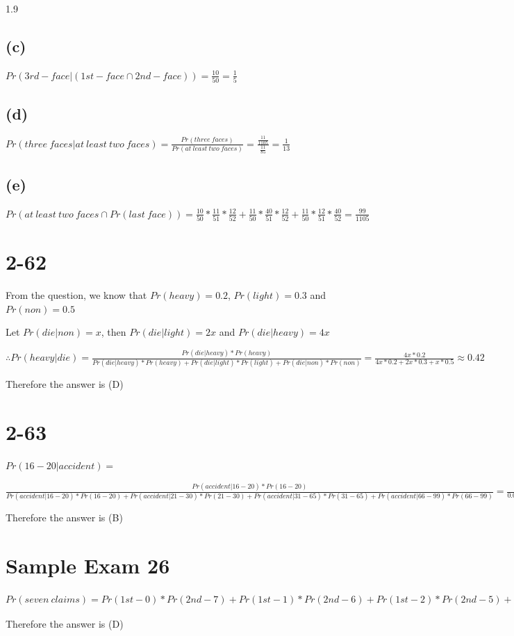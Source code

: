 \documentclass[12pt]{article}
\begin{document}
\begin{spacing}{1.9}
\subsection*{(c)}
$Pr(3rd-face|(1st-face \cap 2nd-face))= \frac{10}{50}= \frac{1}{5}$

\subsection*{(d)}
$Pr(three\ faces|at\ least\ two\ faces)=\frac{Pr(three\ faces)}{Pr(at\ least\ two\ faces)}= \frac{\frac{11}{1105}}{\frac{11}{85}} = \frac{1}{13}$

\subsection*{(e)}
$Pr(at\ least\ two\ faces\cap Pr(last\ face))= \frac{10}{50}* \frac{11}{51}* \frac{12}{52} + \frac{11}{50}* \frac{40}{51}* \frac{12}{52}+ \frac{11}{50}* \frac{12}{51}* \frac{40}{52}= \frac{99}{1105}$

\section*{2-62}
From the question, we know that $Pr(heavy)=0.2$, $Pr(light)=0.3$ and $Pr(non)=0.5$

Let $Pr(die|non)=x$, then $Pr(die|light)=2x$ and $Pr(die|heavy)=4x$

$\therefore Pr(heavy|die)=\frac{Pr(die|heavy)*Pr(heavy)}{ Pr(die|heavy)*Pr(heavy)+ Pr(die|light)*Pr(light) + Pr(die|non)*Pr(non)}= \frac{4x*0.2}{4x*0.2 + 2x*0.3+ x*0.5} \approx 0.42$

Therefore the answer is (D)

\section*{2-63}
$Pr(16-20|accident)= $

$\frac{Pr(accident|16-20)*Pr(16-20)}{ Pr(accident|16-20)*Pr(16-20)+ Pr(accident|21-30)*Pr(21-30)+ Pr(accident|31-65)*Pr(31-65)+ Pr(accident|66-99)*Pr(66-99)}= \frac{0.06*0.08}{0.06*0.08+ 0.03*0.15+ 0.02*0.49+ 0.04*0.28} \approx 0.16$

Therefore the answer is (B)

\section*{Sample Exam 26}
$Pr(seven\ claims)=Pr(1st-0)*Pr(2nd-7)+ Pr(1st-1)*Pr(2nd-6)+ Pr(1st-2)*Pr(2nd-5)+ Pr(1st-3)*Pr(2nd-4)+ Pr(1st-4)*Pr(2nd-3)+ Pr(1st-5)*Pr(2nd-2)+ Pr(1st-6)*Pr(2nd-1)+ Pr(1st-7)*Pr(2nd-0)= \frac{1}{2}*\frac{1}{2^8} + \frac{1}{2^2}*\frac{1}{2^7}+ \frac{1}{2^3}*\frac{1}{2^6}+ \frac{1}{2^4}*\frac{1}{2^5}+ \frac{1}{2^5}*\frac{1}{2^4}+ \frac{1}{2^6}*\frac{1}{2^3}+ \frac{1}{2^7}*\frac{1}{2^2}+ \frac{1}{2^8}*\frac{1}{2^1}= \frac{1}{64}$

Therefore the answer is (D)

\end{spacing}
\end{document}
